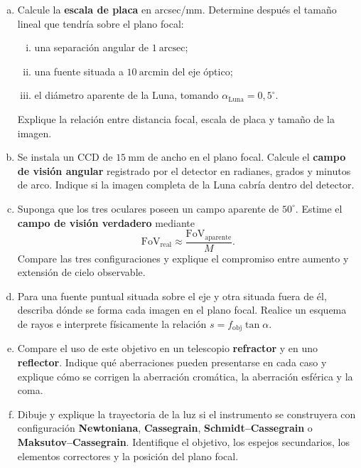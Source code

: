 \begin{enumerate}[a)]
    \item Calcule la \textbf{escala de placa} en arcsec/mm. Determine después
    el tamaño lineal que tendría sobre el plano focal:
    \begin{enumerate}[i)]
        \item una separación angular de $1~\text{arcsec}$;
        \item una fuente situada a $10~\text{arcmin}$ del eje óptico;
        \item el diámetro aparente de la Luna, tomando
        $\alpha_{\text{Luna}}=0{,}5^\circ$.
    \end{enumerate}
    Explique la relación entre distancia focal, escala de placa y tamaño de la
    imagen.

    \item Se instala un CCD de $15~\text{mm}$ de ancho en el plano focal.
    Calcule el \textbf{campo de visión angular} registrado por el detector en
    radianes, grados y minutos de arco. Indique si la imagen completa de la Luna
    cabría dentro del detector.

    \item Suponga que los tres oculares poseen un campo aparente de
    $50^\circ$. Estime el \textbf{campo de visión verdadero} mediante
    \[
        \mathrm{FoV}_{\text{real}}
        \approx\frac{\mathrm{FoV}_{\text{aparente}}}{M}.
    \]
    Compare las tres configuraciones y explique el compromiso entre aumento y
    extensión de cielo observable.

    \item Para una fuente puntual situada sobre el eje y otra situada fuera de
    él, describa dónde se forma cada imagen en el plano focal. Realice un
    esquema de rayos e interprete físicamente la relación
    $s=f_{\text{obj}}\tan\alpha$.

    \item Compare el uso de este objetivo en un telescopio
    \textbf{refractor} y en uno \textbf{reflector}. Indique qué aberraciones
    pueden presentarse en cada caso y explique cómo se corrigen la aberración
    cromática, la aberración esférica y la coma.

    \item Dibuje y explique la trayectoria de la luz si el instrumento se
    construyera con configuración \textbf{Newtoniana},
    \textbf{Cassegrain}, \textbf{Schmidt--Cassegrain} o
    \textbf{Maksutov--Cassegrain}. Identifique el objetivo, los espejos
    secundarios, los elementos correctores y la posición del plano focal.


\end{enumerate}
